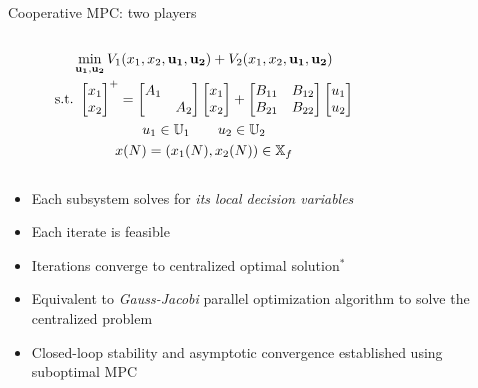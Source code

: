 \documentclass[table]{beamer}
\newcommand{\Redm}[1]{{\color{red}{#1}}}
\newcommand{\Bluem}[1]{{\color{blue}{#1}}}
\begin{document}
\newsavebox{\Vcentral}
\savebox{\Vcentral}{\LARGE $V_1(\Redm{x_1},\Bluem{x_2},\Redm{\mathbf{u_1}},\Bluem{\mathbf{u_2}})+V_2(\Redm{x_1},\Bluem{x_2},\Redm{\mathbf{u_1}},\Bluem{\mathbf{u_2}})$}
\begin{frame}{Cooperative MPC: two players}
 \begin{columns}
  \begin{column}{0.5\textwidth}
   {\color{uwred}{Centralized MPC}}
   {\scriptsize
    \begin{gather*}
     \min_{\Redm{\mathbf{u_1}},\Bluem{\mathbf{u_2}}} 
     V_1(\Redm{x_1},\Bluem{x_2},\Redm{\mathbf{u_1}},\Bluem{\mathbf{u_2}})+V_2(\Redm{x_1},\Bluem{x_2},\Redm{\mathbf{u_1}},\Bluem{\mathbf{u_2}}) \\
     \text{s.t.~}\begin{bmatrix}\Redm{x_1}\\\Bluem{x_2}\end{bmatrix}^{+} = \begin{bmatrix}A_1 &
     \\ & A_2\end{bmatrix}\begin{bmatrix}\Redm{x_1}\\\Bluem{x_2}\end{bmatrix} +
     \begin{bmatrix}B_{11} & B_{12}
     \\B_{21} & B_{22}\end{bmatrix}\begin{bmatrix}\Redm{u_1}\\\Bluem{u_2}\end{bmatrix}\\
     \Redm{u_1} \in \mathbb{U}_1 \qquad \Bluem{u_2} \in \mathbb{U}_2\\
     x(N) = (x_1(N),x_2(N)) \in \mathbb{X}_f
    \end{gather*}
   }
  \end{column}
  \begin{column}{0.5\textwidth}
   \begin{center}
   \end{center}
  \end{column}
 \end{columns}

 {\color{uwred}{Cooperative MPC}}
  \begin{itemize}
   \item Each subsystem solves for \textit{its local decision variables}
   \item<3-> Each iterate is \alert{feasible}
   \item<4-> Iterations converge to \alert{centralized optimal} solution$^*$
   \item<5-> Equivalent to \textit{Gauss-Jacobi} parallel optimization algorithm
   to solve the centralized problem
   \item<6-> Closed-loop stability and asymptotic convergence
     established using \alert{suboptimal MPC}
  \end{itemize}
\end{frame}
\end{document}
